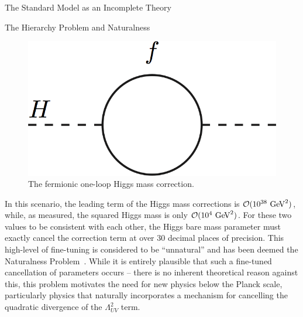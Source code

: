 \begin{section}{The Standard Model as an Incomplete Theory}
\begin{subsection}{The Hierarchy Problem and Naturalness}
\begin{figure}[tbp!]
\begin{center}
\includegraphics[angle=0,width=0.40\columnwidth]{fig/higgs_fermion_loop.png}
\end{center}
\caption{The fermionic one-loop Higgs mass correction.}
\label{fig:higgs_fermion_loop}
\end{figure}

In this scenario, the leading term of the Higgs mass corrections is $\mathcal{O}(10^{38}~\mathrm{Ge\kern -0.1em V}^2)$, while, as measured, the squared Higgs mass is only $\mathcal{O}(10^{4}~\mathrm{Ge\kern -0.1em V}^2)$.
For these two values to be consistent with each other, the Higgs bare mass parameter must exactly cancel the correction term at over 30 decimal places of precision.
This high-level of fine-tuning is considered to be ``unnatural'' and has been deemed the Naturalness Problem~\cite{Feng:2013pwa,Craig:2013cxa,Papucci:2011wy,Casas:2014eca}.
While it is entirely plausible that such a fine-tuned cancellation of parameters occurs -- there is no inherent theoretical reason against this, this problem motivates the need for new physics below the Planck scale, particularly physics that naturally incorporates a mechanism for cancelling the quadratic divergence of the $\Lambda_{UV}^2$ term.

\end{subsection}

\end{section}
